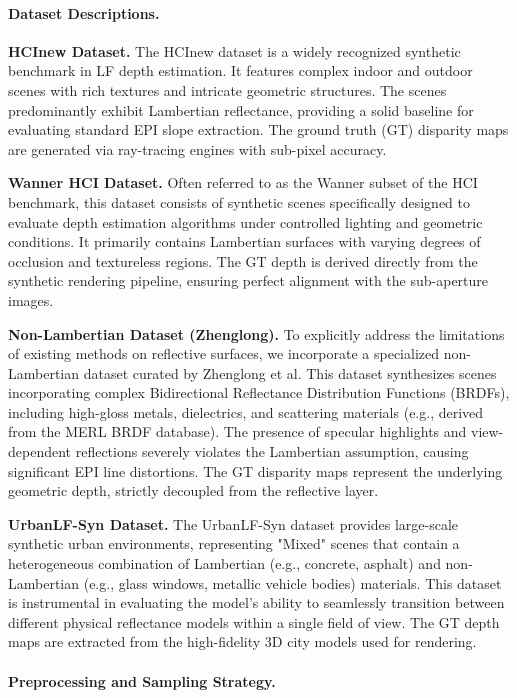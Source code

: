 \documentclass[lettersize,journal]{IEEEtran}
\begin{document}
\paragraph{Dataset Descriptions.}

\textbf{HCInew Dataset.} The HCInew dataset is a widely recognized synthetic benchmark in LF depth estimation. It features complex indoor and outdoor scenes with rich textures and intricate geometric structures. The scenes predominantly exhibit Lambertian reflectance, providing a solid baseline for evaluating standard EPI slope extraction. The ground truth (GT) disparity maps are generated via ray-tracing engines with sub-pixel accuracy. 

\textbf{Wanner HCI Dataset.} Often referred to as the Wanner subset of the HCI benchmark, this dataset consists of synthetic scenes specifically designed to evaluate depth estimation algorithms under controlled lighting and geometric conditions. It primarily contains Lambertian surfaces with varying degrees of occlusion and textureless regions. The GT depth is derived directly from the synthetic rendering pipeline, ensuring perfect alignment with the sub-aperture images.

\textbf{Non-Lambertian Dataset (Zhenglong).} To explicitly address the limitations of existing methods on reflective surfaces, we incorporate a specialized non-Lambertian dataset curated by Zhenglong et al. This dataset synthesizes scenes incorporating complex Bidirectional Reflectance Distribution Functions (BRDFs), including high-gloss metals, dielectrics, and scattering materials (e.g., derived from the MERL BRDF database). The presence of specular highlights and view-dependent reflections severely violates the Lambertian assumption, causing significant EPI line distortions. The GT disparity maps represent the underlying geometric depth, strictly decoupled from the reflective layer.

\textbf{UrbanLF-Syn Dataset.} The UrbanLF-Syn dataset provides large-scale synthetic urban environments, representing "Mixed" scenes that contain a heterogeneous combination of Lambertian (e.g., concrete, asphalt) and non-Lambertian (e.g., glass windows, metallic vehicle bodies) materials. This dataset is instrumental in evaluating the model's ability to seamlessly transition between different physical reflectance models within a single field of view. The GT depth maps are extracted from the high-fidelity 3D city models used for rendering.

\paragraph{Preprocessing and Sampling Strategy.}
\end{document}
